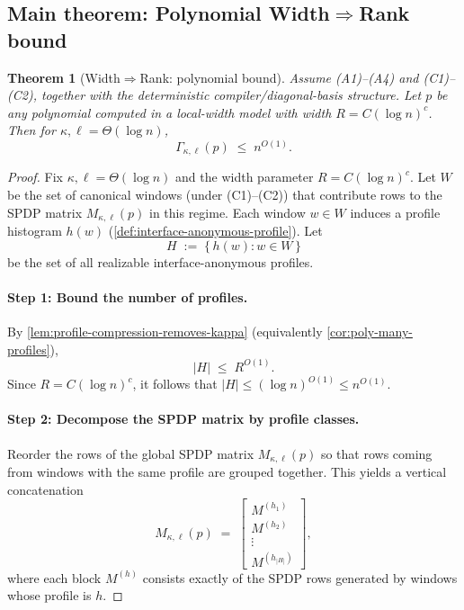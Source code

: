 \documentclass[12pt]{article}
\newtheorem{theorem}{Theorem}[section]
\theoremstyle{definition}
\theoremstyle{remark}
\begin{document}
\subsection{Main theorem: Polynomial Width$\Rightarrow$Rank bound}
\label{subsec:poly-width-implies-rank}

\begin{theorem}[Width$\Rightarrow$Rank: polynomial bound]
\label{thm:poly-width-rank}
Assume (A1)--(A4) and (C1)--(C2), together with the deterministic compiler\slash diagonal-basis
structure. Let $p$ be any polynomial computed in a local-width model with width
$R=C(\log n)^c$. Then for $\kappa,\ell=\Theta(\log n)$,
\[
\Gamma_{\kappa,\ell}(p)
\;\le\;
n^{O(1)}.
\]
\end{theorem}

\begin{proof}
Fix $\kappa,\ell=\Theta(\log n)$ and the width parameter $R=C(\log n)^c$.
Let $W$ be the set of canonical windows (under (C1)--(C2)) that contribute
rows to the SPDP matrix $M_{\kappa,\ell}(p)$ in this regime. Each window
$w\in W$ induces a profile histogram $h(w)$ (\ref{def:interface-anonymous-profile}).
Let
\[
H \;:=\; \{\, h(w) : w\in W \,\}
\]
be the set of all realizable interface-anonymous profiles.

\paragraph{Step 1: Bound the number of profiles.}
By \ref{lem:profile-compression-removes-kappa}
(equivalently \ref{cor:poly-many-profiles}),
\[
|H| \;\le\; R^{O(1)}.
\]
Since $R=C(\log n)^c$, it follows that $|H|\le (\log n)^{O(1)}\le n^{O(1)}$.

\paragraph{Step 2: Decompose the SPDP matrix by profile classes.}
Reorder the rows of the global SPDP matrix $M_{\kappa,\ell}(p)$ so that rows coming
from windows with the same profile are grouped together. This yields a vertical
concatenation
\[
M_{\kappa,\ell}(p)
\;=\;
\begin{bmatrix}
M^{(h_1)}\\ \hline
M^{(h_2)}\\ \hline
\vdots\\ \hline
M^{(h_{|H|})}
\end{bmatrix},
\]
where each block $M^{(h)}$ consists exactly of the SPDP rows generated by windows
whose profile is $h$.


\end{proof}
\end{document}
